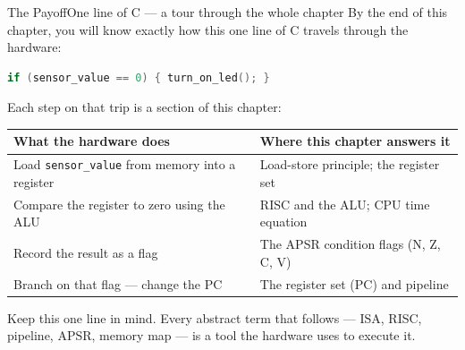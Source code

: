 \documentclass[9pt,aspectratio=169,xcolor=table]{beamer}
\begin{document}
{\beamerextras
\begin{frame}[fragile]{The Payoff}{One line of C --- a tour through the whole chapter}
    \leavevmode
    By the end of this chapter, you will know \alert{exactly} how this one line of C travels through the hardware:

    \vspace{3mm}
    \begin{center}
    \begin{minipage}{.72\textwidth}
\begin{lstlisting}[language=C, basicstyle=\ttfamily\normalsize]
if (sensor_value == 0) { turn_on_led(); }
\end{lstlisting}
    \end{minipage}
    \end{center}

    \vspace{3mm}
    {\small Each step on that trip is a section of this chapter:}

    \vspace{1mm}
    \begin{center}
    {\small
    \striped
    \begin{tabular}{@{}l R{.60\textwidth}@{}}
        \toprule
        \textbf{What the hardware does} & \textbf{Where this chapter answers it} \\
        \midrule
        Load \texttt{sensor\_value} from memory into a register
            & Load-store principle; the register set \\
        Compare the register to zero using the ALU
            & RISC and the ALU; CPU time equation \\
        Record the result as a flag
            & The APSR condition flags (N, Z, C, V) \\
        Branch on that flag --- change the PC
            & The register set (PC) and pipeline \\
        \bottomrule
    \end{tabular}}
    \end{center}

    \vspace{1mm}
    {\small\centering Keep this one line in mind. Every abstract term that follows --- ISA, RISC, pipeline, APSR, memory map --- is a tool the hardware uses to execute it.\par}
\end{frame}
}


\end{document}
